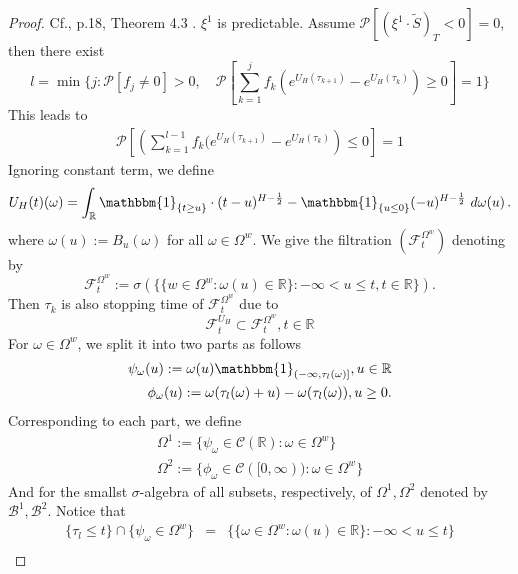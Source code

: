 \documentclass[a4paper, twoside, 11pt]{article}
\theoremstyle{definition}
\newcommand{\brkt}[1]{\left({#1} \right)}
\begin{document}
\begin{proof}
  Cf.\cite{chridito}, p.18, Theorem 4.3 . $\xi^1$ is predictable. %
  Assume ${\mathcal{P}}[(\xi^1 \cdot \tilde{S})_T < 0] = 0$, then there exist 
  $$
  l = \min \{ j: \mathcal{P}[f_j \neq 0] > 0,\hspace{1em} \mathcal{P}[\sum_{k=1}^{j} f_k (e^{U_H(\tau_{k+1})} - e^{U_H(\tau_k)})\ge 0]=1 \}
  $$
  This leads to
  \begin{eqnarray*}
	\mathcal{P} \left[\brkt{\sum_{k=1}^{l-1} f_k (e^{U_H(\tau_{k+1})} - e^{U_H(\tau_k)}} \le 0\right] = 1 
  \end{eqnarray*}
  Ignoring constant term, we define 
  $$
  U_H(t)(\omega) = \int_{\mathbb{R}} \mathbbm{1}_{\{t\ge u\}}\cdot (t-u)^{H-\frac{1}{2}} - \mathbbm{1}_{\{u\le 0\}} (-u)^{H-\frac{1}{2}} \, \mathop{d\omega(u)} .
  $$
  where $\omega(u) := B_u(\omega)$ for all $\omega \in \Omega^w$.
  We give the filtration $(\mathcal{F}_t^{\Omega^w})$ denoting by 
  $$
  \mathcal{F}_t^{\Omega^w} := \sigma(\{\{w \in \Omega^w : \omega(u) \in \mathbb{R}\} : -\infty < u \le t, t\in\mathbb{R}\}).
  $$
  Then $\tau_k$ is also stopping time of $\mathcal{F}_t^{\Omega^w}$ due to
  $$
  \mathcal{F}^{U_H}_t \subset \mathcal{F}_t^{\Omega^w},	t \in \mathbb{R}
  $$
 For $\omega \in \Omega^w$, we split it into two parts as follows
 \begin{eqnarray*}
 \psi_{\omega}(u) := \omega(u)\mathbbm{1}_{(-\infty, \tau_l(\omega)]}, u\in \mathbb{R} \\
   \phi_{\omega}(u) := \omega(\tau_l(\omega) + u) - \omega(\tau_l(\omega)), u\ge 0.
 \end{eqnarray*}
Corresponding to each part, we define
\begin{eqnarray*}
  \Omega^1 := \{\psi_{\omega} \in \mathcal{C}(\mathbb{R}) : \omega \in \Omega^w\}\\
  \Omega^2 := \{\phi_{\omega} \in \mathcal{C}([0, \infty)) : \omega \in \Omega^w\}
\end{eqnarray*}
And for the smallst $\sigma$-algebra of all subsets, respectively, of $\Omega^1, \Omega^2$ denoted by $\mathscr{B}^1, \mathscr{B}^2$.
Notice that
\begin{eqnarray*}
  \{\tau_l \le t\} \cap \{\psi_{\omega} \in \Omega^w\} &=& \{\{\omega \in \Omega^w : \omega(u) \in \mathbb{R}\} : -\infty < u \le t\}\\

\end{eqnarray*}
\end{proof}
\end{document}
